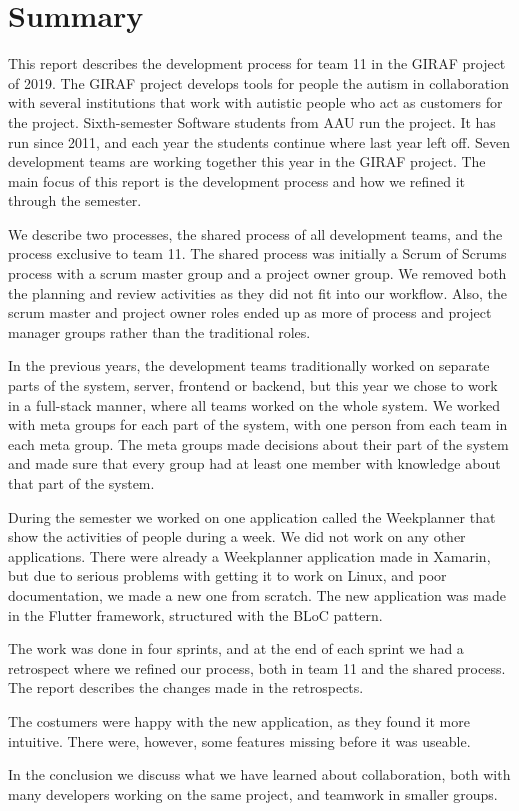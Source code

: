 \section{Summary}

This report describes the development process for team 11 in the GIRAF project of 2019. The GIRAF project develops tools for people the autism in collaboration with several institutions that work with autistic people who act as customers for the project. Sixth-semester Software students from AAU run the project. It has run since 2011, and each year the students continue where last year left off. Seven development teams are working together this year in the GIRAF project. The main focus of this report is the development process and how we refined it through the semester.

We describe two processes, the shared process of all development teams, and the process exclusive to team 11. The shared process was initially a Scrum of Scrums process with a scrum master group and a project owner group. We removed both the planning and review activities as they did not fit into our workflow. Also, the scrum master and project owner roles ended up as more of process and project manager groups rather than the traditional roles. 

In the previous years, the development teams traditionally worked on separate parts of the system, server, frontend or backend, but this year we chose to work in a full-stack manner, where all teams worked on the whole system. We worked with meta groups for each part of the system, with one person from each team in each meta group. The meta groups made decisions about their part of the system and made sure that every group had at least one member with knowledge about that part of the system. 

During the semester we worked on one application called the Weekplanner that show the activities of people during a week. We did not work on any other applications. There were already a Weekplanner application made in Xamarin, but due to serious problems with getting it to work on Linux, and poor documentation, we made a new one from scratch. The new application was made in the Flutter framework, structured with the BLoC pattern. 

The work was done in four sprints, and at the end of each sprint we had a retrospect where we refined our process, both in team 11 and the shared process. The report describes the changes made in the retrospects.

The costumers were happy with the new application, as they found it more intuitive. There were, however, some features missing before it was useable. 

In the conclusion we discuss what we have learned about collaboration, both with many developers working on the same project, and teamwork in smaller groups. 
